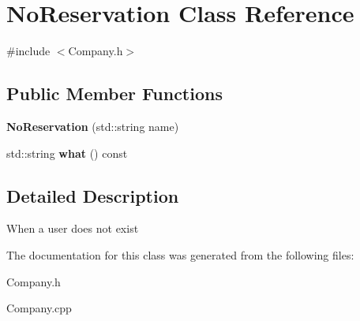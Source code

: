 \hypertarget{class_no_reservation}{}\section{No\+Reservation Class Reference}
\label{class_no_reservation}


{\ttfamily \#include $<$Company.\+h$>$}

\subsection*{Public Member Functions}
\begin{DoxyCompactItemize}
\item 
\mbox{\label{class_no_reservation_a176e966dc45e1011a94e75da18aeb995}} 
{\bfseries No\+Reservation} (std\+::string name)
\item 
\mbox{\label{class_no_reservation_a61b762639f31d431f40285cd32e382fa}} 
std\+::string {\bfseries what} () const
\end{DoxyCompactItemize}


\subsection{Detailed Description}
When a user does not exist 

The documentation for this class was generated from the following files\+:\begin{DoxyCompactItemize}
\item 
Company.\+h\item 
Company.\+cpp\end{DoxyCompactItemize}
